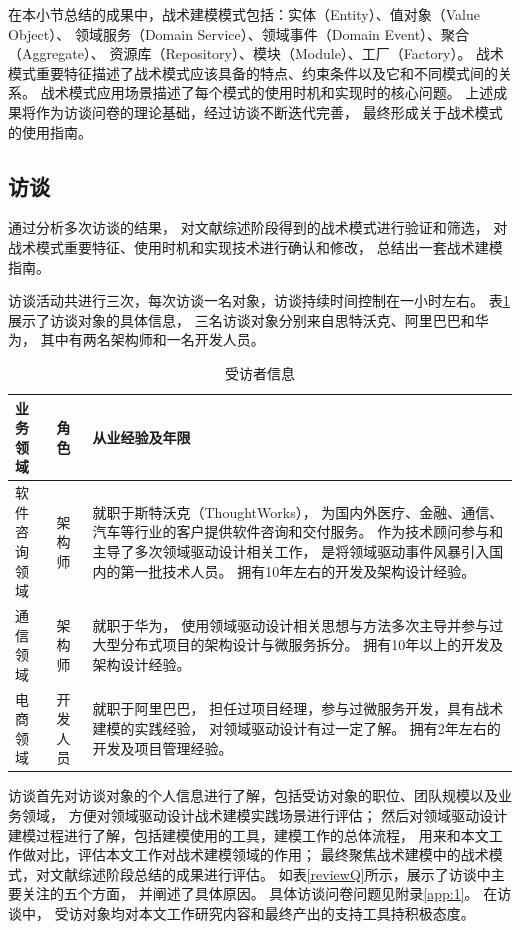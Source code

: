 在本小节总结的成果中，战术建模模式包括：实体（Entity）、值对象（Value Object）、
领域服务（Domain Service）、领域事件（Domain Event）、聚合（Aggregate）、
资源库（Repository）、模块（Module）、工厂（Factory）。
战术模式重要特征描述了战术模式应该具备的特点、约束条件以及它和不同模式间的关系。
战术模式应用场景描述了每个模式的使用时机和实现时的核心问题。
上述成果将作为访谈问卷的理论基础，经过访谈不断迭代完善，
最终形成关于战术模式的使用指南。

\subsection{访谈}

通过分析多次访谈的结果，
对文献综述阶段得到的战术模式进行验证和筛选，
对战术模式重要特征、使用时机和实现技术进行确认和修改，
总结出一套战术建模指南。

访谈活动共进行三次，每次访谈一名对象，访谈持续时间控制在一小时左右。
表\ref{respondents}展示了访谈对象的具体信息，
三名访谈对象分别来自思特沃克、阿里巴巴和华为，
其中有两名架构师和一名开发人员。

{\footnotesize
\begin{longtable}[h]{m{70pt}|m{60pt}|m{255pt}}
    \caption[受访者信息]{受访者信息} \label{respondents} \\
        \hline  
        业务领域&角色&从业经验及年限\\
        \hline
        软件咨询领域&架构师&就职于斯特沃克（ThoughtWorks），
        为国内外医疗、金融、通信、汽车等行业的客户提供软件咨询和交付服务。
        作为技术顾问参与和主导了多次领域驱动设计相关工作，
        是将领域驱动事件风暴引入国内的第一批技术人员。
        拥有10年左右的开发及架构设计经验。\\
        \hline
        通信领域&架构师&就职于华为，
        使用领域驱动设计相关思想与方法多次主导并参与过大型分布式项目的架构设计与微服务拆分。
        拥有10年以上的开发及架构设计经验。\\
        \hline
        电商领域&开发人员&就职于阿里巴巴，
        担任过项目经理，参与过微服务开发，具有战术建模的实践经验，
        对领域驱动设计有过一定了解。
        拥有2年左右的开发及项目管理经验。\\
        \hline

    \end{longtable}
}

访谈首先对访谈对象的个人信息进行了解，包括受访对象的职位、团队规模以及业务领域，
方便对领域驱动设计战术建模实践场景进行评估；
然后对领域驱动设计建模过程进行了解，包括建模使用的工具，建模工作的总体流程，
用来和本文工作做对比，评估本文工作对战术建模领域的作用；
最终聚焦战术建模中的战术模式，对文献综述阶段总结的成果进行评估。
如表\ref{reviewQ}所示，展示了访谈中主要关注的五个方面，
并阐述了具体原因。
具体访谈问卷问题见附录\ref{app:1}。
在访谈中，
受访对象均对本文工作研究内容和最终产出的支持工具持积极态度。

